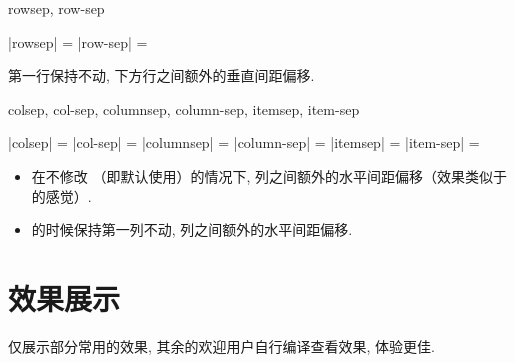 \documentclass{l3doc}
\begin{document}
\begin{documentation}
\begin{function}{rowsep, row-sep}
  \begin{syntax}
    |rowsep| = 
    |row-sep| = 
  \end{syntax}
  第一行保持不动, 下方行之间额外的垂直间距偏移.
\end{function}

\begin{function}{colsep, col-sep, columnsep, column-sep, itemsep, item-sep}
  \begin{syntax}
    |colsep| = 
    |col-sep| = 
    |columnsep| = 
    |column-sep| = 
    |itemsep| = 
    |item-sep| = 
  \end{syntax}
    \begin{itemize}
      \item 在不修改  （即默认使用）的情况下, 列之间额外的水平间距偏移（效果类似于  的感觉）. 
      \item {} 的时候保持第一列不动, 列之间额外的水平间距偏移. 
    \end{itemize}
\end{function}





\section{效果展示}
仅展示部分常用的效果, 其余的欢迎用户自行编译查看效果, 体验更佳.


\end{documentation}
\end{document}

